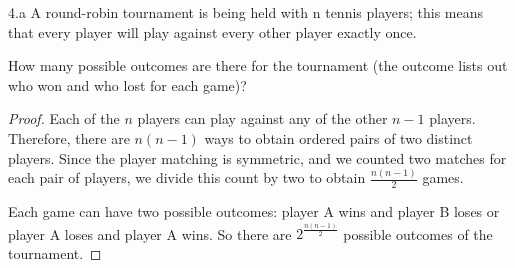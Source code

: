\begin{exercise}{4.a}
A round-robin tournament is being held with n tennis players; this means that every
player will play against every other player exactly once.

\vspace{1em}
How many possible outcomes are there for the tournament (the outcome lists out
who won and who lost for each game)?
\end{exercise}

\begin{proof}
    Each of the $n$ players can play against any of the other $n-1$ players. Therefore, there are $n(n-1)$ ways to obtain ordered pairs of two distinct players. Since the player matching is symmetric, and we counted two matches for each pair of players, we divide this count by two to obtain $\frac{n(n-1)}{2}$ games.

    Each game can have two possible outcomes: player A wins and player B loses or player A loses and player A wins. So there are $2^{\frac{n(n-1)}{2}}$ possible outcomes of the tournament.
\end{proof}

